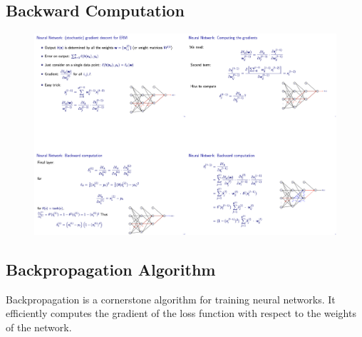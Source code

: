 

\subsection{Backward Computation}
\begin{figure}[H]
    \centering
    \includegraphics[width=1\linewidth]{img/nnbc.png}
    
    
\end{figure}
\subsection{Backpropagation Algorithm}\label{BackPropAlgo}
Backpropagation is a cornerstone algorithm for training neural networks. It efficiently computes the gradient of the loss function with respect to the weights of the network.


